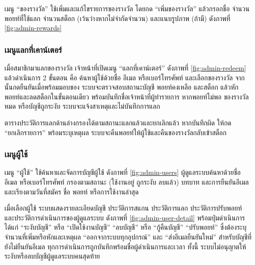 
เมนู ``ของรางวัล'' ใช้เพิ่มและแก้ไขรายการของรางวัล โดยกด ``เพิ่มของรางวัล'' แล้วกรอกชื่อ จำนวนพอยท์ที่ใช้แลก จำนวนสต็อก (เว้นว่างหากไม่จำกัดจำนวน) และแนบรูปภาพ (ถ้ามี) ดังภาพที่ \ref{fig:admin-rewards}


\subsubsection{เมนูแลกที่เคาน์เตอร์}
\label{sec:admin-redeem}

เมื่อสมาชิกมาแลกของรางวัล เจ้าหน้าที่เปิดเมนู ``แลกที่เคาน์เตอร์'' ดังภาพที่ \ref{fig:admin-redeem} แล้วดำเนินการ 2 ขั้นตอน คือ ค้นหาผู้ใช้ด้วยชื่อ อีเมล หรือเบอร์โทรศัพท์ และเลือกของรางวัล จากนั้นกดยืนยันเมื่อพร้อมมอบของ ระบบจะตรวจสอบสถานะบัญชี พอยท์คงเหลือ และสต็อก แล้วหักพอยท์และลดสต็อกในขั้นตอนเดียว พร้อมบันทึกชื่อเจ้าหน้าที่ผู้ทำรายการ หากพอยท์ไม่พอ ของรางวัลหมด หรือบัญชีถูกระงับ ระบบจะแจ้งสาเหตุและไม่บันทึกการแลก


ตารางประวัติการแลกด้านล่างกรองได้ตามสถานะแลกแล้วและยกเลิกแล้ว หากบันทึกผิด ให้กด ``ยกเลิกรายการ'' พร้อมระบุเหตุผล ระบบจะคืนพอยท์ให้ผู้ใช้และคืนของรางวัลกลับเข้าสต็อก

\subsubsection{เมนูผู้ใช้}

เมนู ``ผู้ใช้'' ใช้ค้นหาและจัดการบัญชีผู้ใช้ ดังภาพที่ \ref{fig:admin-users} ผู้ดูแลระบบค้นหาด้วยชื่อ อีเมล หรือเบอร์โทรศัพท์ กรองตามสถานะ (ใช้งานอยู่ ถูกระงับ ลบแล้ว) บทบาท และการยืนยันอีเมล และเรียงตามวันที่สมัคร ชื่อ พอยท์ หรือการใช้งานล่าสุด


เมื่อเลือกผู้ใช้ ระบบแสดงรายละเอียดบัญชี ประวัติการสแกน ประวัติการแลก ประวัติการปรับพอยท์ และประวัติการดำเนินการของผู้ดูแลระบบ ดังภาพที่ \ref{fig:admin-user-detail} พร้อมปุ่มดำเนินการ ได้แก่ ``ระงับบัญชี'' หรือ ``เปิดใช้งานบัญชี'' ``ลบบัญชี'' หรือ ``กู้คืนบัญชี'' ``ปรับพอยท์'' ซึ่งต้องระบุจำนวนที่เพิ่มหรือหักและเหตุผล ``ออกจากระบบทุกอุปกรณ์'' และ ``ส่งอีเมลยืนยันใหม่'' สำหรับบัญชีที่ยังไม่ยืนยันอีเมล ทุกการดำเนินการถูกบันทึกพร้อมชื่อผู้ดำเนินการและเวลา ทั้งนี้ ระบบไม่อนุญาตให้ระงับหรือลบบัญชีผู้ดูแลระบบคนสุดท้าย

